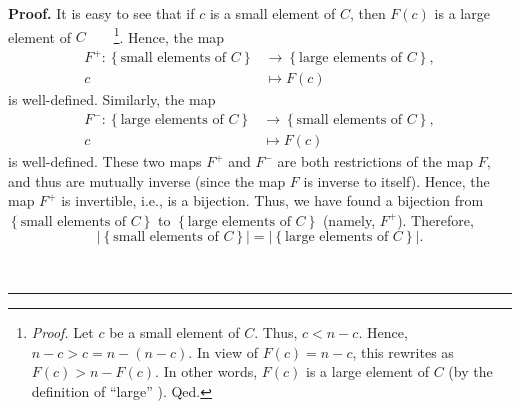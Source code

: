\documentclass[numbers=enddot,12pt,final,onecolumn,notitlepage]{scrartcl}%
\numberwithin{exer}{subsection}
\theoremstyle{definition}
\newenvironment{fineprint}{\begin{small}}{\end{small}}
\newenvironment{proof}[1][Proof]{\noindent\textbf{#1.} }{\ \rule{0.5em}{0.5em}}
\begin{document}
\begin{fineprint}
\begin{proof}
It is easy to see that if $c$ is a small element of $C$, then $F\left(
c\right)  $ is a large element of $C$\ \ \ \ \footnote{\textit{Proof.} Let $c$
be a small element of $C$. Thus, $c<n-c$. Hence, $n-c>c=n-\left(  n-c\right)
$. In view of $F\left(  c\right)  =n-c$, this rewrites as $F\left(  c\right)
>n-F\left(  c\right)  $. In other words, $F\left(  c\right)  $ is a large
element of $C$ (by the definition of \textquotedblleft large\textquotedblright%
). Qed.}. Hence, the map%
\begin{align*}
F^{+}:\left\{  \text{small elements of }C\right\}   &  \rightarrow\left\{
\text{large elements of }C\right\}  ,\\
c  &  \mapsto F\left(  c\right)
\end{align*}
is well-defined. Similarly, the map%
\begin{align*}
F^{-}:\left\{  \text{large elements of }C\right\}   &  \rightarrow\left\{
\text{small elements of }C\right\}  ,\\
c  &  \mapsto F\left(  c\right)
\end{align*}
is well-defined. These two maps $F^{+}$ and $F^{-}$ are both restrictions of
the map $F$, and thus are mutually inverse (since the map $F$ is inverse to
itself). Hence, the map $F^{+}$ is invertible, i.e., is a bijection. Thus, we
have found a bijection from $\left\{  \text{small elements of }C\right\}  $ to
$\left\{  \text{large elements of }C\right\}  $ (namely, $F^{+}$). Therefore,%
\[
\left\vert \left\{  \text{small elements of }C\right\}  \right\vert
=\left\vert \left\{  \text{large elements of }C\right\}  \right\vert .
\]



\end{proof}
\end{fineprint}
\end{document}
